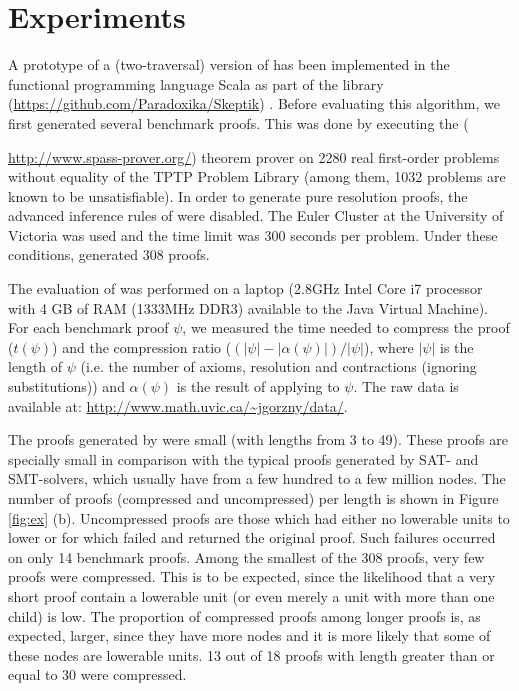 
\section{Experiments} \label{sec:exp}
A prototype
of a (two-traversal) version of {\SFOLowerUnits} has been implemented in the functional programming language Scala
as part of the \skeptik
 library (\url{https://github.com/Paradoxika/Skeptik}) \cite{Skeptik}. 
%
Before evaluating this algorithm, we first generated several benchmark proofs. This was done by executing the {\SPASS} ({\url{http://www.spass-prover.org/}) theorem prover on 2280 real first-order problems without equality of the TPTP Problem Library 
(among them, 1032 problems are known to be unsatisfiable). In order to generate pure resolution proofs, the advanced inference rules of {\SPASS} were disabled. The Euler Cluster at the University of Victoria
was used and the time limit was 300 seconds per problem. Under these conditions, {\SPASS} generated 308 proofs. 

The evaluation of {\SFOLowerUnits} was performed on a laptop (2.8GHz Intel Core i7 processor with 4 GB of RAM (1333MHz DDR3) available to the Java Virtual Machine). For each benchmark proof $\psi$, we measured the time needed to compress the proof ($t(\psi)$) and the compression ratio ($(|\psi|-|\alpha(\psi)|)/|\psi|$), where $|\psi|$ is the length of $\psi$ (i.e. the number of axioms, resolution and contractions (ignoring substitutions)) and $\alpha(\psi)$ is the result of applying {\SFOLowerUnits} to $\psi$.
The raw data is available at: \url{http://www.math.uvic.ca/~jgorzny/data/}. %


The proofs generated by {\SPASS} were small (with lengths from 3 to 49). These proofs are specially small in comparison with the typical proofs generated by SAT- and SMT-solvers, which usually have from a few hundred to a few million nodes. The number of proofs (compressed and uncompressed) per length is shown in Figure \ref{fig:ex} (b). Uncompressed proofs are those which had either no lowerable units to lower or for which \SFOLowerUnits failed and returned the original proof. Such failures occurred on only 14 benchmark proofs. Among the smallest of the 308 proofs, very few proofs were compressed. This is to be expected, since the likelihood that a very short proof contain a lowerable unit (or even merely a unit with more than one child) is low. The proportion of compressed proofs among longer proofs is, as expected, larger, since they have more nodes and it is more likely that some of these nodes are lowerable units. 13 out of 18 proofs with length greater than or equal to 30 were compressed. 

}

